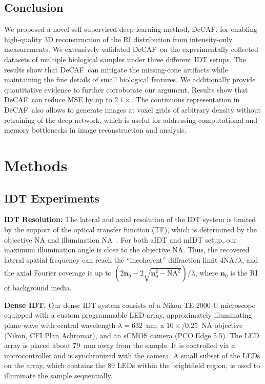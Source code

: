 \documentclass[11pt]{article}
\theoremstyle{plain} %
\def\proposed{DeCAF}
\def\nbm{{\bm{n}}}
\begin{document}
\subsection*{Conclusion}
\label{Sec:Conclusion}
We proposed a novel self-supervised deep learning method, \proposed, for enabling high-quality 3D reconstruction of the RI distribution from intensity-only measurements. 
We extensively validated \proposed~on the experimentally collected datasets of multiple biological samples under three different IDT setups. 
The results show that \proposed~can mitigate the missing-cone artifacts while maintaining the fine details of small biological features.
We additionally provide quantitative evidence to further corroborate our argument. Results show that \proposed~can reduce MSE by up to $2.1\times$.
The continuous representation in \proposed~also allows to generate images at voxel grids of arbitrary density without retraining of the deep network, which is useful for addressing computational and memory bottlenecks in image reconstruction and analysis.

\section*{Methods}
\label{Sec:Methods}
\subsection*{IDT Experiments}

\textbf{IDT Resolution:} The lateral and axial resolution of the IDT system is limited by the support of the optical transfer function (TF), which is determined by the objective NA and illumination NA~\cite{Ling.etal18}. For both aIDT and mIDT setup, our maximum illumination angle is close to the objective NA. Thus, the recovered lateral spatial frequency can reach the ``incoherent'' diffraction limit $4\text{NA}/\lambda$, and the axial Fourier coverage is up to $(2\nbm_0 - 2\sqrt{\nbm_0^2-\text{NA}^2})/\lambda$, where $\nbm_0$ is the RI of background media.

\vspace{0.5em}
\noindent\textbf{Dense IDT.}
Our dense IDT system consists of a Nikon TE 2000-U microscope equipped with a custom programmable LED array, approximately illuminating plane wave with central wavelength $\lambda=632$~nm; a $10\times$/$0.25$~NA objective (Nikon, CFI Plan Achromat), and an sCMOS camera (PCO.Edge 5.5).
The LED array is placed about $79$~mm away from the sample.
It is controlled via a microcontroller and is synchronized with the camera.
A small subset of the LEDs on the array, which contains the $89$ LEDs within the brightfield region, is used to illuminate the sample sequentially.
\end{document}
